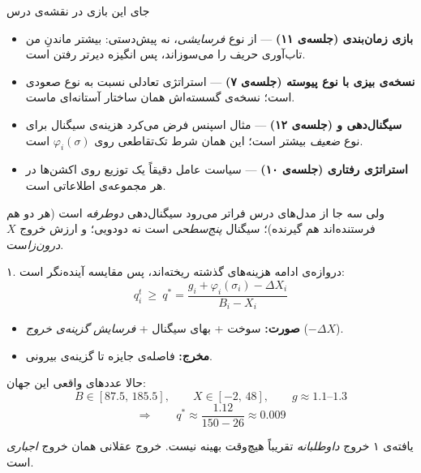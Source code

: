 \documentclass[12pt,aspectratio=169]{beamer}
\newcommand{\sig}{\sigma}
\begin{document}
\begin{frame}{جای این بازی در نقشه‌ی درس}
\begin{itemize}\itemsep4pt
  \item \textbf{بازی زمان‌بندی (جلسه‌ی ۱۱)} — از نوع \emph{فرسایشی}، نه
        پیش‌دستی: بیشتر ماندنِ من تاب‌آوری حریف را می‌سوزاند، پس انگیزه
        دیرتر رفتن است.
  \item \textbf{نسخه‌ی بیزی با نوع پیوسته (جلسه‌ی ۷)} — استراتژی تعادلی
        نسبت به نوع صعودی است؛ نسخه‌ی گسسته‌اش همان ساختار آستانه‌ای ماست.
  \item \textbf{سیگنال‌دهی و  (جلسه‌ی ۱۲)} — مثال اسپنس فرض
        می‌کرد هزینه‌ی سیگنال برای نوع \emph{ضعیف} بیشتر است؛ این همان
        شرط تک‌تقاطعی روی $\varphi_i(\sig)$ است.
  \item \textbf{استراتژی رفتاری (جلسه‌ی ۱۰)} — سیاست عامل دقیقاً یک توزیع
        روی اکشن‌ها در هر مجموعه‌ی اطلاعاتی است.
\end{itemize}
\vfill
\begin{alertblock}{ولی سه جا از مدل‌های درس فراتر می‌رود}
\centering\small
سیگنال‌دهی \emph{دوطرفه} است (هر دو هم فرستنده‌اند هم گیرنده)؛ سیگنال
\emph{پنج‌سطحی} است نه دودویی؛ و ارزش خروج $X$ \emph{درون‌زا}ست.
\end{alertblock}
\end{frame}

\begin{frame}{۱. دروازه‌ی ادامه}
هزینه‌های گذشته ریخته‌اند، پس مقایسه آینده‌نگر است:
\[
  \boxed{\;q_i^t\ \ge\ q^\ast=\frac{g_i+\varphi_i(\sig_i)-\Delta X_i}{B_i-X_i}\;}
\]
\begin{itemize}\itemsep2pt
  \item \textbf{صورت:} سوخت + بهای سیگنال + \emph{فرسایش گزینه‌ی خروج}
        ($-\Delta X$).
  \item \textbf{مخرج:} فاصله‌ی جایزه تا گزینه‌ی بیرونی.
\end{itemize}
\vfill
حالا عددهای واقعی این جهان:
\[
  B\in[87.5,\,185.5],\qquad X\in[-2,\,48],\qquad g\approx1.1\text{–}1.3
\]
\[
  \Rightarrow\qquad q^\ast\approx\frac{1.12}{150-26}\approx\mathbf{0.009}
\]
\begin{alertblock}{یافته‌ی ۱}
خروج \emph{داوطلبانه} تقریباً هیچ‌وقت بهینه نیست. خروج عقلانی همان خروج
\emph{اجباری} است.
\end{alertblock}
\end{frame}
\end{document}
